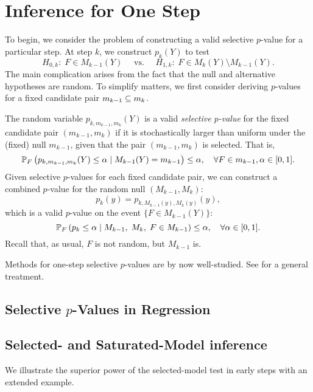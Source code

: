 \documentclass{article}
\begin{document}


\section{Inference for One Step}

To begin, we consider the problem of constructing a valid selective $p$-value for a particular step. At step $k$, we construct $p_k(Y)$ to test
\[
  H_{0,k}:\; F \in M_{k-1}(Y)
  \quad \text{ vs. } \quad
  H_{1,k}:\; F \in M_k(Y) \setminus M_{k-1}(Y).
\]
The main complication arises from the fact that the null and alternative hypotheses are random. To simplify matters, we first consider deriving $p$-values for a fixed candidate pair $m_{k-1} \sub m_k$.

The random variable  $p_{k,m_{k-1},m_k}(Y)$ is a valid {\em selective $p$-value} for the fixed candidate pair $(m_{k-1},m_k)$ if it is stochastically larger than uniform under the (fixed) null $m_{k-1}$, given that the pair $(m_{k-1},m_k)$ is selected. That is,
\[
\P_F\left(p_{k,m_{k-1},m_k}(Y) \leq \alpha \mid M_{k-1}(Y) = m_{k-1}\right) 
\leq \alpha, \quad \forall F\in m_{k-1}, \alpha \in [0,1].
\]
Given selective $p$-values for each fixed candidate pair, we can construct a combined $p$-value for the random null $(M_{k-1},M_k)$: 
\[
p_k(y) = p_{k, M_{k-1}(y), M_k(y)}(y),
\]
which is a valid $p$-value on the event $\{F \in M_{k-1}(Y)\}$:
\[
\P_F\left(p_k \leq \alpha \mid M_{k-1}, \;M_k, 
  \;F\in M_{k-1}\right) \leq \alpha, \quad \forall \alpha \in [0,1].
\]
Recall that, as usual, $F$ is not random, but $M_{k-1}$ is.

Methods for one-step selective $p$-values are by now well-studied.  See \citet{fithian2014optimal} for a general treatment. 

\subsection{Selective $p$-Values in Regression}

\subsection{Selected- and Saturated-Model inference}

We illustrate the superior power of the selected-model test in early steps with an extended example.
\end{document}
